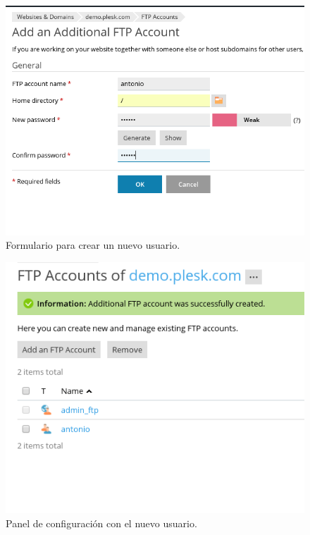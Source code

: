 \begin{figure}[H]
    \begin{center}
        \includegraphics[scale=0.5]{imagenes/img58}
        \caption{Formulario para crear un nuevo usuario.}
        \label{fig53}
    \end{center}
\end{figure}

\begin{figure}[H]
    \begin{center}
        \includegraphics[scale=0.5]{imagenes/img59}
        \caption{Panel de configuración con el nuevo usuario.}
        \label{fig54}
    \end{center}
\end{figure}




